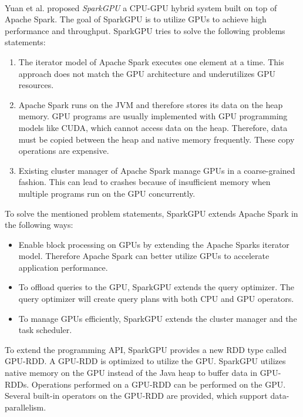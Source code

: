 \paragraph{}
Yuan et al. \cite{Yuan2016SparkGPU} proposed \textit{SparkGPU} a CPU-GPU hybrid system built on top of Apache Spark.
The goal of SparkGPU is to utilize GPUs to achieve high performance and throughput.
SparkGPU tries to solve the following problems statements:
\begin{enumerate}
\item The iterator model of Apache Spark executes one element at a time.
This approach does not match the GPU architecture and underutilizes GPU resources.

\item Apache Spark runs on the JVM and therefore stores its data on the heap memory.
GPU programs are usually implemented with GPU programming models like CUDA, which cannot access data on the heap.
Therefore, data must be copied between the heap and native memory frequently. These copy operations are expensive.

\item Existing cluster manager of Apache Spark manage GPUs in a coarse-grained fashion.
This can lead to crashes because of insufficient memory when multiple programs run on the GPU concurrently.
\end{enumerate}
To solve the mentioned problem statements, SparkGPU extends Apache Spark in the following ways:
\begin{itemize}
\item Enable block processing on GPUs by extending the Apache Sparks iterator model. Therefore Apache Spark can better utilize GPUs to accelerate application performance.

\item To offload queries to the GPU, SparkGPU extends the query optimizer. The query optimizer will create query plans with both CPU and GPU operators.

\item To manage GPUs efficiently, SparkGPU extends the cluster manager and the task scheduler.
\end{itemize}
To extend the programming API, SparkGPU provides a new RDD type called GPU-RDD.
A GPU-RDD is optimized to utilize the GPU.
SparkGPU utilizes native memory on the GPU instead of the Java heap to buffer data in GPU-RDDs.
Operations performed on a GPU-RDD can be performed on the GPU. Several built-in operators on the GPU-RDD are provided, which support data-parallelism.


